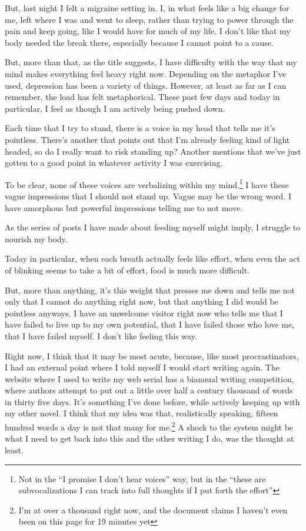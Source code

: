 \documentclass[12pt]{article}
\newcommand{\say}[1]{``#1''}
\renewcommand{\,}{\textsuperscript{,}}
\begin{document}
But, last night I felt a migraine setting in.  
I, in what feels like a big change for me, left where I was and went to sleep, rather than trying to power through the pain and keep going, like I would have for much of my life.  
I don't like that my body needed the break there, especially because I cannot point to a cause.

But, more than that, as the title suggests, I have difficulty with the way that my mind makes everything feel heavy right now.  
Depending on the metaphor I've used, depression has been a variety of things.  
However, at least as far as I can remember, the load has felt metaphorical.  
These past few days and today in particular, I feel as though I am actively being pushed down.

Each time that I try to stand, there is a voice in my head that tells me it's pointless.  
There's another that points out that I'm already feeling kind of light headed, so do I really want to risk standing up?  
Another mentions that we've just gotten to a good point in whatever activity I was exercising.

To be clear, none of these voices are verbalizing within my mind.\footnote{Not in the \say{I promise I don't hear voices} way, but in the \say{these are subvocalizations I can track into full thoughts if I put forth the effort}}  
I have these vague impressions that I should not stand up.  
Vague may be the wrong word.  
I have amorphous but powerful impressions telling me to not move.

As the series of posts I have made about feeding myself might imply, I struggle to nourish my body.

Today in particular, when each breath actually feels like effort, when even the act of blinking seems to take a bit of effort, food is much more difficult.

But, more than anything, it's this weight that presses me down and tells me not only that I cannot do anything right now, but that anything I did would be pointless anyways.  
I have an unwelcome visitor right now who tells me that I have failed to live up to my own potential, that I have failed those who love me, that I have failed myself.  
I don't like feeling this way.

Right now, I think that it may be most acute, because, like most procrastinators, I had an external point where I told myself I would start writing again.  
The website where I used to write my web serial has a biannual writing competition, where authors attempt to put out a little over half a century thousand of words in thirty five days.  
It's something I've done before, while actively keeping up with my other novel.  
I think that my idea was that, realistically speaking, fifteen hundred words a day is not that many for me.\footnote{I'm at over a thousand right now, and the document claims I haven't even been on this page for 19 minutes yet}  
A shock to the system might be what I need to get back into this and the other writing I do, was the thought at least.
\end{document}

